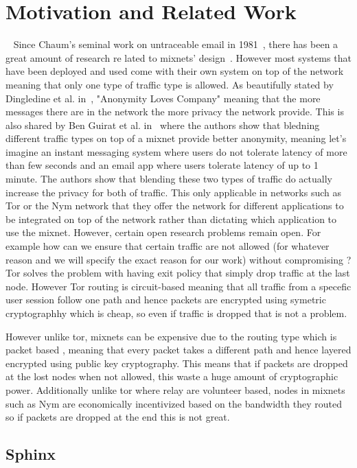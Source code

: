 \section{Motivation and Related Work}~\label{sec:related}
Since Chaum’s seminal work on untraceable email in 1981~\cite{chaum-mix}, there has been a great amount of research re
lated to mixnets' design~\cite{piotrowska2017loopix, van2015vuvuzela, kwon2020xrd, lazar2018karaoke, cottrell1995mixmaster, alexopoulos2017MCMIX, chaum2016cmix, chaum-mix, danezis2003mixminion}. However most systems that have been deployed and used come with their own system on top of the network meaning that only one type of traffic type is allowed. As beautifully stated by Dingledine et al. in~\cite{dingledine2006anonymity}, "Anonymity Loves Company" meaning that the more messages there are in the network the more privacy the network provide. This is also shared by Ben Guirat et al. in~\cite{benguirat2023blending} where the authors show that bledning different traffic types on top of a mixnet provide better anonymity, meaning let's imagine an instant messaging system where users do not tolerate latency of more than few seconds and an email app where users tolerate latency of up to 1 minute. The authors show that blending these two types of traffic do actually increase the privacy for both of traffic. This only applicable in networks such as Tor or the Nym network that they offer the network for different applications to be integrated on top of the network rather than dictating which application to use the mixnet.
However, certain open research problems remain open. For example how can we ensure that certain traffic are not allowed (for whatever reason and we will specify the exact reason for our work) without compromising ?
Tor solves the problem with having exit policy that simply drop traffic at the last node. However Tor routing is circuit-based meaning that all traffic from a specefic user session follow one path and hence packets are encrypted using symetric cryptographhy which is cheap, so even if traffic is dropped that is not a problem.

However unlike tor, mixnets can be expensive due to the routing type which is packet based , meaning that every packet takes a different path and hence layered encrypted using public key cryptography. This means that if packets are dropped at the lost nodes when not allowed, this waste a huge amount of cryptographic power. Additionally unlike tor where relay are volunteer based, nodes in mixnets such as Nym are economically incentivized based on the bandwidth they routed so if packets are dropped at the end this is not great.

\subsection{Sphinx}
